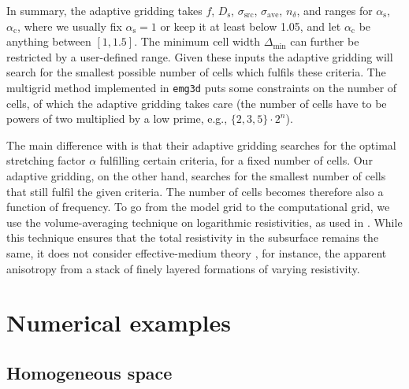\documentclass[
    manuscript,
    revised,
  ]{geophysics}
\newcommand{\mr}[1]{\mathrm{#1}}
\newcommand{\emg}[2]{\texttt{emg#1#2}\xspace}
\begin{document}
In summary, the adaptive gridding takes $f$, $D_\mr{s}$, $\sigma_\mr{src}$,
$\sigma_\mr{ave}$, $n_\delta$, and ranges for $\alpha_\mr{s}$, $\alpha_\mr{c}$,
where we usually fix $\alpha_\mr{s}=1$ or keep it at least below 1.05, and let
$\alpha_\mr{c}$ be anything between $[1, 1.5]$. The minimum cell width
$\Delta_\mr{min}$ can further be restricted by a user-defined range. Given
these inputs the adaptive gridding will search for the smallest possible number
of cells which fulfils these criteria. The multigrid method implemented in
\emg3d puts some constraints on the number of cells, of which the adaptive
gridding takes care (the number of cells have to be powers of two multiplied by
a low prime, e.g., $\{2,3,5\}\cdot2^n$).

The main difference with \cite{GEO.08.Mulder} is that their adaptive gridding
searches for the optimal stretching factor $\alpha$ fulfilling certain
criteria, for a fixed number of cells. Our adaptive gridding, on the other
hand, searches for the smallest number of cells that still fulfil the given
criteria. The number of cells becomes therefore also a function of frequency.
To go from the model grid to the computational grid, we use the
volume-averaging technique on logarithmic resistivities, as used in
\cite{GEO.07.Plessix}. While this technique ensures that the total resistivity
in the subsurface remains the same, it does not consider effective-medium
theory \citep{GEO.03.Davydycheva}, for instance, the apparent anisotropy from a
stack of finely layered formations of varying resistivity.

\section{Numerical examples}

\subsection{Homogeneous space}
\end{document}
